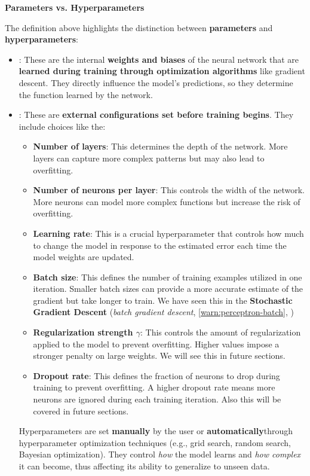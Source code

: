 \begin{flushleft}
    \textcolor{Green3}{ \textbf{Parameters vs. Hyperparameters}}
\end{flushleft}
The definition above highlights the distinction between \textbf{parameters} and \textbf{hyperparameters}:
\begin{itemize}
    \item {}: These are the internal \textbf{weights and biases} of the neural network that are \textbf{learned during training through optimization algorithms} like gradient descent. They directly influence the model's predictions, so they determine the function learned by the network.
    \item {}: These are \textbf{external configurations set before training begins}. They include choices like the:
    \begin{itemize}
        \item \textbf{Number of layers}: This determines the depth of the network. More layers can capture more complex patterns but may also lead to overfitting.
        \item \textbf{Number of neurons per layer}: This controls the width of the network. More neurons can model more complex functions but increase the risk of overfitting.
        \item \textbf{Learning rate}: This is a crucial hyperparameter that controls how much to change the model in response to the estimated error each time the model weights are updated.
        \item \textbf{Batch size}: This defines the number of training examples utilized in one iteration. Smaller batch sizes can provide a more accurate estimate of the gradient but take longer to train. We have seen this in the \textbf{Stochastic Gradient Descent} (\emph{batch gradient descent}, \autoref{warn:perceptron-batch}, )
        \item \textbf{Regularization strength $\gamma$}: This controls the amount of regularization applied to the model to prevent overfitting. Higher values impose a stronger penalty on large weights. We will see this in future sections.
        \item \textbf{Dropout rate}: This defines the fraction of neurons to drop during training to prevent overfitting. A higher dropout rate means more neurons are ignored during each training iteration. Also this will be covered in future sections.
    \end{itemize}
    Hyperparameters are set \textbf{manually} by the user or \textbf{automatically}\break through hyperparameter optimization techniques (e.g., grid search, random search, Bayesian optimization). They control \emph{how} the model learns and \emph{how complex} it can become, thus affecting its ability to generalize to unseen data.
\end{itemize}


